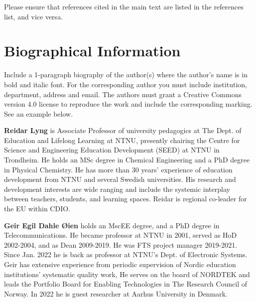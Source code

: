 \documentclass[11pt]{cdio}
\begin{document}
Please ensure that references cited in the main text are listed in the references list, and vice versa.

\setlength\bibitemsep{2pt}%

\printbibliography{}

\begin{center}
\end{center}

\newpage{}
\section{Biographical Information}
Include a 1-paragraph biography of the author(s) where the author’s name is in bold and italic font. For the corresponding author you must include institution, department, address and email. The authors must grant a Creative Commons version 4.0 license to reproduce the work and include the corresponding marking. See an example below.

\textbf{Reidar Lyng} is Associate Professor of university pedagogics at The Dept.
of Education and Lifelong Learning at NTNU, presently chairing the Centre for Science and Engineering Education Development (SEED) at NTNU in Trondheim.
He holds an MSc degree in Chemical Engineering and a PhD degree in Physical Chemistry.
He has more than 30 years’ experience of education development from NTNU and several Swedish universities.
His research and development interests are wide ranging and include the systemic interplay between teachers, students, and learning spaces.
Reidar is regional co-leader for the EU within CDIO.

\textbf{Geir Egil Dahle Øien} holds an MscEE degree, and a PhD degree in Telecommunications.
He became professor at NTNU in 2001, served as HoD 2002-2004, and as Dean 2009-2019.
He was FTS project manager 2019-2021.
Since Jan.
2022 he is back as professor at NTNU’s Dept.
of Electronic Systems.
Geir has extensive experience from periodic supervision of Nordic education institutions’ systematic quality work, He serves on the board of NORDTEK and leads the Portfolio Board for Enabling Technologies in The Research Council of Norway.
In 2022 he is guest researcher at Aarhus University in Denmark.
\end{document}
